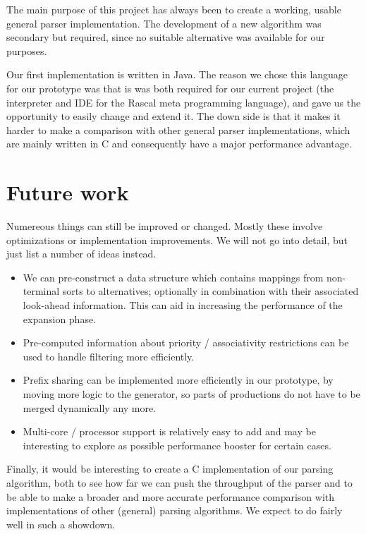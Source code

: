 \documentclass[a4paper,10pt]{article}
\begin{document}
The main purpose of this project has always been to create a working, usable general parser implementation. The development of a new algorithm was secondary but required, since no suitable alternative was available for our purposes.

Our first implementation is written in Java. The reason we chose this language for our prototype was that is was both required for our current project (the interpreter and IDE for the Rascal meta programming language), and gave us the opportunity to easily change and extend it. The down side is that it makes it harder to make a comparison with other general parser implementations, which are mainly written in C and consequently have a major performance advantage.

\section{Future work}

Numereous things can still be improved or changed. Mostly these involve optimizations or implementation improvements. We will not go into detail, but just list a number of ideas instead.

\begin{itemize}
 \setlength{\itemsep}{0pt}
 \setlength{\parskip}{0pt}
 \setlength{\parsep}{0pt}
 
 \item We can pre-construct a data structure which contains mappings from non-terminal sorts to alternatives; optionally in combination with their associated look-ahead information. This can aid in increasing the performance of the expansion phase.
 \item Pre-computed information about priority / associativity restrictions can be used to handle filtering more efficiently.
 \item Prefix sharing can be implemented more efficiently in our prototype, by moving more logic to the generator, so parts of productions do not have to be merged dynamically any more.
 \item Multi-core / processor support is relatively easy to add and may be interesting to explore as possible performance booster for certain cases.
\end{itemize}

Finally, it would be interesting to create a C implementation of our parsing algorithm, both to see how far we can push the throughput of the parser and to be able to make a broader and more accurate performance comparison with implementations of other (general) parsing algorithms. We expect to do fairly well in such a showdown.
\end{document}
